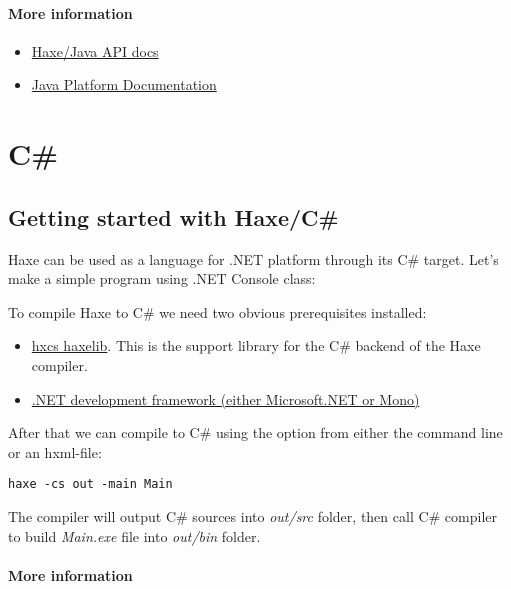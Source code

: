 \paragraph{More information}

\begin{itemize}
	\item \href{http://api.haxe.org/java/}{Haxe/Java API docs}
	\item \href{https://docs.oracle.com/javase/}{Java Platform Documentation}
\end{itemize}


\section{C\#}
\label{target-cs}

\subsection{Getting started with Haxe/C#}
\label{target-cs-getting-started}

Haxe can be used as a language for .NET platform through its C# target. Let's make a simple program using .NET Console class:


To compile Haxe to C# we need two obvious prerequisites installed:

\begin{itemize}
	\item \href{http://lib.haxe.org/p/hxcs}{hxcs haxelib}. This is the support library for the C# backend of the Haxe compiler.
	\item \href{http://api.haxe.org/java/}{.NET development framework (either Microsoft.NET or Mono)}
\end{itemize}

After that we can compile to C# using the  option from either the command line or an hxml-file:

\begin{lstlisting}
haxe -cs out -main Main
\end{lstlisting}

The compiler will output C# sources into  \emph{out/src} folder, then call C# compiler to build  \emph{Main.exe} file into  \emph{out/bin} folder.

\paragraph{More information}

